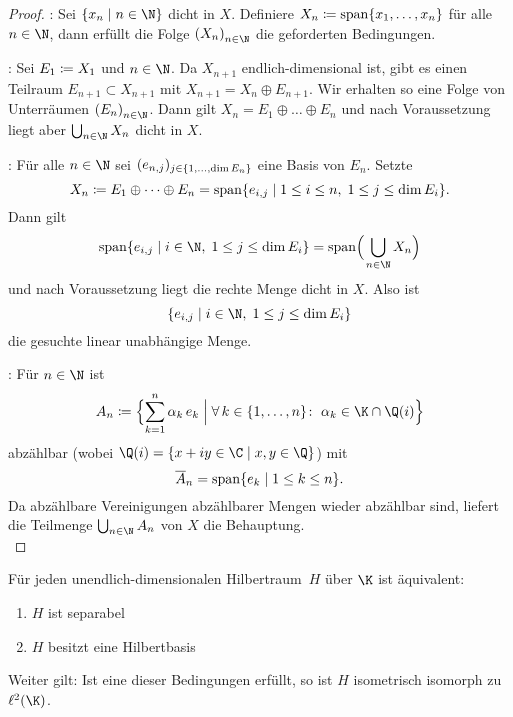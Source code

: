 \begin{proof}
    : Sei $\{x_n \Mid n\in\N \}$ dicht in $X$. Definiere
    $X_n \coloneqq \operatorname{span} \{x_1,\dots,x_n\}$ für alle $n\in\N$, dann erfüllt
    die Folge $\nSeq X$ die geforderten Bedingungen.
    
    : Sei $E_1\coloneqq X_1$ und $n\in\N$.
    Da $X_{n+1}$ endlich-dimensional ist, gibt es einen Teilraum $E_{n+1}\subset
    X_{n+1}$ mit $X_{n+1} = X_n\oplus E_{n+1}$. Wir erhalten so eine Folge von
    Unterräumen $\nSeq E$. Dann gilt $X_n = E_1\oplus\dots\oplus E_n$ und nach
    Voraussetzung liegt aber $\bigcup_{n\in\N} X_n$ dicht in $X$.
    
    : Für alle $n\in\N$ sei $(e_{n,j})_{j\in\{1,\ldots,\dim E_n\}}$
    eine Basis von $E_n$. Setzte 
    \[ X_n \defeq E_1\oplus\dots\oplus E_n
        = \spann\{ e_{i,j} \Mid 1\leq i\leq n, \; 1\leq j\leq\dim E_i \}  
    . \]
    Dann gilt
    \[ \spann\{ e_{i,j} \Mid i\in\N, \; 1\leq j\leq\dim E_i \} 
        = \spann\Bigl(\mkern2mu\bigcup_{n\in\N} X_n\Bigr)
    \]
    und nach Voraussetzung liegt die rechte Menge dicht in $X$. Also ist
    \[ \{ e_{i,j} \Mid i\in\N, \; 1\leq j\leq\dim E_i \} \]
    die gesuchte linear unabhängige Menge.
    
    : Für $n\in\N$ ist
    \[ A_n \defeq \Bigl\{
        \ksum^n  \alpha_k\,e_k \cMid\Big \forall\,k\in\setOneto{n}\colon\;
            \alpha_k\in\K\cap\Q(i)
        \Bigr\}
    \]
    abzählbar (wobei $\Q(i)=\{x+iy\in\C\Mid x,y\in\Q\}$)  mit
    \[ \setclosure A_n =
        \spann\{ e_k \Mid 1\leq k\leq n \}
    . \]
    Da abzählbare Vereinigungen abzählbarer Mengen wieder abzählbar sind,
    liefert die Teilmenge $\bigcup_{n\in\N} A_n$ von $X$ die Behauptung.
    \\
\end{proof}

\begin{thSatz} \label{vl15:satz6.20}
    Für jeden unendlich-dimensionalen Hilbertraum~$H$ über $\K$ ist äquivalent:
    \begin{enumerate}[(1)]
        \item \label{vl15:satz6.20:1}
            $H$ ist separabel
        \item \label{vl15:satz6.20:2}
            $H$ besitzt eine Hilbertbasis
    \end{enumerate}
    Weiter gilt: Ist eine dieser Bedingungen erfüllt, so ist $H$ isometrisch
    isomorph zu $\ell^2(\K)$.
\end{thSatz}


